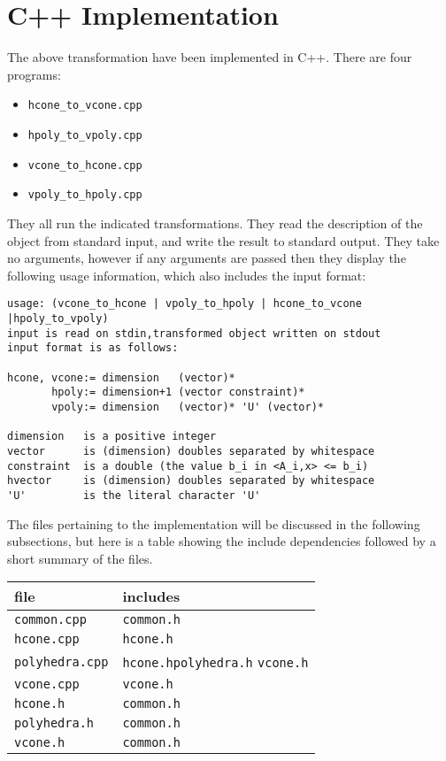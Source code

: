 \documentclass[fleqn]{article}
\newcommand{\0}{\vec{0}}
\begin{document}
\section{C++ Implementation}
The above transformation have been implemented in C++.  There are four programs:
\begin{itemize}
	\item \texttt{hcone\_to\_vcone.cpp}
	\item \texttt{hpoly\_to\_vpoly.cpp}
	\item \texttt{vcone\_to\_hcone.cpp}
	\item \texttt{vpoly\_to\_hpoly.cpp}
\end{itemize}
They all run the indicated transformations.  They read the description of the object from standard input, and write the result to standard output.  They take no arguments, however if any arguments are passed then they display the following usage information, which also includes the input format:
\begin{verbatim}
usage: (vcone_to_hcone | vpoly_to_hpoly | hcone_to_vcone |hpoly_to_vpoly)
input is read on stdin,transformed object written on stdout
input format is as follows:
 
hcone, vcone:= dimension   (vector)*
       hpoly:= dimension+1 (vector constraint)*
       vpoly:= dimension   (vector)* 'U' (vector)*

dimension   is a positive integer
vector      is (dimension) doubles separated by whitespace
constraint  is a double (the value b_i in <A_i,x> <= b_i)
hvector     is (dimension) doubles separated by whitespace
'U'         is the literal character 'U'
\end{verbatim}

The files pertaining to the implementation will be discussed in the following subsections, but here is a table showing the include dependencies followed by a short summary of the files. \\

\begin{tabular}{|l|p{9em}|}
\hline
file & includes \\
\hline
\texttt{common.cpp} &  \texttt{common.h} \\
\texttt{hcone.cpp} &  \texttt{hcone.h} \\
\texttt{polyhedra.cpp} &   \texttt{hcone.h}\hfill \texttt{polyhedra.h} \hfill\hspace{2em} \texttt{vcone.h} \\
\texttt{vcone.cpp} &  \texttt{vcone.h} \\
\hline
\texttt{hcone.h} &  \texttt{common.h} \\
\texttt{polyhedra.h} &  \texttt{common.h} \\
\texttt{vcone.h} &  \texttt{common.h} \\
\hline
\end{tabular}\\
\end{document}
